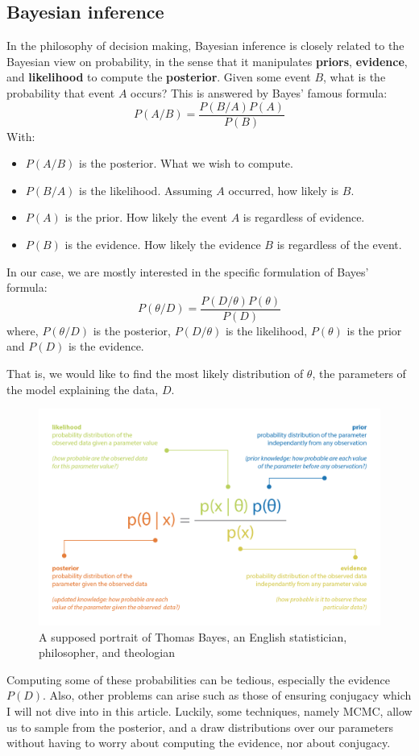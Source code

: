\subsection{Bayesian inference}
In the philosophy of decision making, Bayesian inference is closely related to the Bayesian view on probability, in the sense that it manipulates \textbf{priors}, \textbf{evidence}, and \textbf{likelihood} to compute the \textbf{posterior}. Given some event $B$, what is the probability that event $A$ occurs? This is answered by Bayes' famous formula:
\begin{equation}P(A / B)=\frac{P(B / A) P(A)}{P(B)}\end{equation}
With:
\begin{itemize}
\item $P(A / B)$ is the posterior. What we wish to compute.
\item $P(B / A)$ is the likelihood. Assuming $A$ occurred, how likely is $B$.
\item $P(A)$ is the prior. How likely the event $A$ is regardless of evidence.
\item $P(B)$ is the evidence. How likely the evidence $B$ is regardless of the event.
\end{itemize}

In our case, we are mostly interested in the specific formulation of Bayes' formula:
\begin{equation}
P(\theta / D)=\frac{P(D / \theta) P(\theta)}{P(D)}
\end{equation}
where, $P(\theta / D)$ is the posterior, $P(D / \theta)$ is the likelihood, $P(\theta)$ is the prior and $P(D)$ is the evidence.

That is, we would like to find the most likely distribution of $\theta$, the parameters of the model explaining the data, $D$.

\begin{figure}[h]
    \centering
\includegraphics[width=.3\textwidth]{pic/p05c08-snip01}
    \caption{A supposed portrait of Thomas Bayes, an English statistician, philosopher, and theologian}
    \label{fig:p05c08-snip01}
\end{figure}

Computing some of these probabilities can be tedious, especially the evidence $P(D)$. Also, other problems can arise such as those of ensuring conjugacy which I will not dive into in this article. Luckily, some techniques, namely MCMC, allow us to sample from the posterior, and a draw distributions over our parameters without having to worry about computing the evidence, nor about conjugacy.

